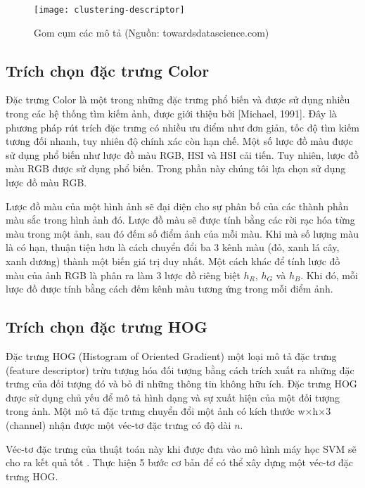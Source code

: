 \begin{figure}[h]
	\centering
	\texttt{[image: clustering-descriptor]}
	\caption[Gom cụm các mô tả]{Gom cụm các mô tả (Nguồn: towardsdatascience.com)}
	\label{fig:clustering-descriptor}
\end{figure}	


\subsection{Trích chọn đặc trưng Color}
Đặc trưng Color là một trong những đặc trưng phổ biến và được sử dụng nhiều trong các hệ thống tìm kiếm ảnh, được giới thiệu bởi [Michael, 1991]. Đây là phương pháp rút trích đặc trưng có nhiều ưu điểm như đơn giản, tốc độ tìm kiếm tương đối nhanh, tuy nhiên độ chính xác còn hạn chế. Một số lược đồ màu được sử dụng phổ biến như lược đồ màu RGB, HSI và HSI cải tiến. Tuy nhiên, lược đồ màu RGB được sử dụng phổ biến.  Trong phần này chúng tôi lựa chọn sử dụng lược đồ màu RGB.\par

Lược đồ màu của một hình ảnh sẽ đại diện cho sự phân bố của các thành phần màu sắc trong hình ảnh đó. Lược đồ màu sẽ được tính bằng các rời rạc hóa từng màu trong một ảnh, sau đó đếm số điểm ảnh của mỗi màu. Khi mà số lượng màu là có hạn, thuận tiện hơn là cách chuyển đổi ba 3 kênh màu (đỏ, xanh lá cây, xanh dương) thành một biến giá trị duy nhất. Một cách khác để tính lược đồ màu của ảnh RGB là phân ra làm 3 lược đồ riêng biệt $h_R$, $h_G$ và $h_B$. Khi đó, mỗi lược đồ được tính bằng cách đếm kênh màu tương ứng trong mỗi điểm ảnh.

\subsection{Trích chọn đặc trưng HOG}
Đặc trưng HOG (Histogram of Oriented Gradient) \cite{dalal2005histograms} một loại mô tả đặc trưng (feature descriptor) trừu tượng hóa đối tượng bằng cách trích xuất ra những đặc trưng của đối tượng đó và bỏ đi những thông tin không hữu ích. Đặc trưng HOG được sử dụng chủ yếu để mô tả hình dạng và sự xuất hiện của một đối tượng trong ảnh. Một mô tả đặc trưng chuyển đổi một ảnh có kích thước w$\times$h$\times$3 (channel) nhận được một véc-tơ đặc trưng có độ dài $n$.\par

Véc-tơ đặc trưng của thuật toán này khi được đưa vào mô hình máy học SVM sẽ cho ra kết quả tốt \cite{learnopencv}. Thực hiện 5 bước cơ bản để có thể xây dựng một véc-tơ đặc trưng HOG. \par

